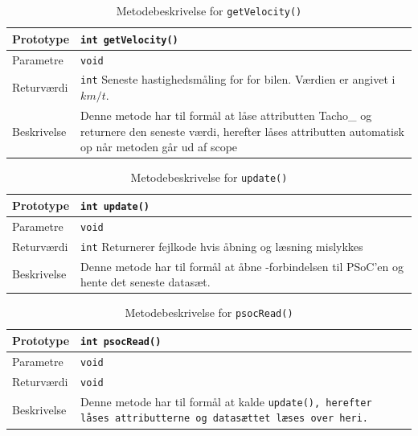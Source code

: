 \begin{table}[h]
	\begin{tabularx}{\textwidth}{| L{2.5 cm} | Z |} \hline
		Prototype 	& \texttt{int getVelocity()} 	\\\hline
		Parametre 	& \texttt{void} \newline  		\\\hline
		Returværdi 	& \texttt{int}  \newline Seneste hastighedsmåling for for bilen. Værdien er angivet i $km/t$. \\\hline
		Beskrivelse	& Denne metode har til formål at låse attributten Tacho\_ og returnere den seneste værdi, herefter låses attributten automatisk op når metoden går ud af scope \\\hline	
	\end{tabularx}
	\caption{Metodebeskrivelse for  \texttt{getVelocity()}}
	\label{table:met_getvelocity}
\end{table}

\begin{table}[h]
	\begin{tabularx}{\textwidth}{| L{2.5 cm} | Z |} \hline
		Prototype 	& \texttt{int update()} 		\\\hline
		Parametre 	& \texttt{void} \newline 		\\\hline
		Returværdi 	& \texttt{int}  \newline Returnerer fejlkode hvis åbning og læsning mislykkes \\\hline
		Beskrivelse	& Denne metode har til formål at åbne \IIC-forbindelsen til PSoC'en og hente det seneste datasæt. \\\hline
	\end{tabularx}
	\caption{Metodebeskrivelse for  \texttt{update()}}
	\label{table:met_update}
\end{table}
\clearpage

\begin{table}[h]
	\begin{tabularx}{\textwidth}{| L{2.5 cm} | Z |} \hline
		Prototype 	& \texttt{int psocRead()} 		\\\hline
		Parametre 	& \texttt{void} \newline 		\\\hline
		Returværdi 	& \texttt{void} \newline 		\\\hline
		Beskrivelse	& Denne metode har til formål at kalde \texttt{update(), herefter låses attributterne og datasættet læses over heri.}\\\hline
	\end{tabularx}
	\caption{Metodebeskrivelse for  \texttt{psocRead()}}
	\label{table:met_psocRead}
\end{table}
\clearpage